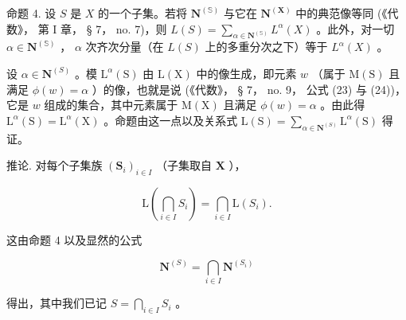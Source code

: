 命题 4. 设 \(S\) 是 \(X\) 的一个子集。若将 \(\mathbf{N}^{(\mathbb{S})}\) 与它在 \(\mathbf{N}^{(\mathbf{X})}\) 中的典范像等同 (《代数》， 第 I 章， § 7， no. 7)，则 \(L(S) = \sum_{\alpha \in \mathbf{N}^{(\mathbb{S})}} L^{\alpha}(X)\) 。此外，对一切 \(\alpha \in \mathbf{N}^{(\mathbb{S})}\) ， \(\alpha\) 次齐次分量（在 \(L(S)\) 上的多重分次之下）等于 \(L^{\alpha}(X)\) 。

 设 \(\alpha \in \mathbf{N}^{(S)}\) 。模 \(\mathrm{L}^{\alpha}(\mathrm{S})\) 由 \(\mathrm{L}(\mathrm{X})\) 中的像生成，即元素 \(w\) （属于 \(\mathrm{M}(\mathrm{S})\) 且满足 \(\phi(w) = \alpha\) ）的像，也就是说 (《代数》， § 7， no. 9， 公式 (23) 与 (24))，它是 \(w\) 组成的集合，其中元素属于 \(\mathrm{M}(\mathrm{X})\) 且满足 \(\phi(w) = \alpha\) 。由此得 \(\mathrm{L}^{\alpha}(\mathrm{S}) = \mathrm{L}^{\alpha}(\mathrm{X})\) 。命题由这一点以及关系式 \(\mathrm{L}(\mathrm{S}) = \sum_{\alpha \in \mathbf{N}^{(S)}}\mathrm{L}^{\alpha}(\mathrm{S})\) 得证。

推论. 对每个子集族 \((\mathbf{S}_i)_{i\in I}\) （子集取自 \(\mathbf{X}\) ），

\[
\mathrm{L} \left(\bigcap_ {i \in I} S _ {i}\right) = \bigcap_ {i \in I} \mathrm{L} (S _ {i}).\tag{16}
\]

这由命题 4 以及显然的公式

\[
\mathbf {N} ^ {(S)} = \bigcap_ {i \in I} \mathbf {N} ^ {(S _ {i})}\tag{17}
\]

得出，其中我们已记 \(S = \bigcap_{i \in I} S_i\) 。

